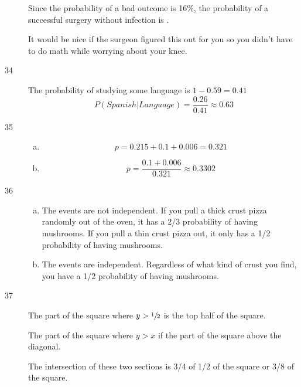 \documentclass[letterpaper]{exam}
\begin{document}
\begin{description}
        Since the probability of a bad outcome is 16\%, the probability of a
        successful surgery without infection is .

        It would be nice if the surgeon figured this out for you so you didn't
        have to do math while worrying about your knee.


      \item[34]
        The probability of studying some language is $1 - 0.59 = 0.41$
        \[
          P(Spanish | Language) = \frac{0.26}{0.41} \approx 0.63
        \]

      \item[35]
        \begin{enumerate}[(a)]
          \item 
            \[
              p = 0.215 + 0.1 + 0.006 = \boxed{ 0.321 }
            \]

          \item
            \[
              p = \frac{0.1 + 0.006}{0.321} \approx \boxed{ 0.3302 }
            \]
        \end{enumerate}

      \item[36]
        \begin{enumerate}[(a)]
          \item The events are not independent. If you pull a thick crust pizza
            randomly out of the oven, it has a 2/3 probability of having
            mushrooms. If you pull a thin crust pizza out, it only has a 1/2
            probability of having mushrooms.

          \item The events are independent. Regardless of what kind of crust you
            find, you have a 1/2 probability of having mushrooms.
        \end{enumerate}

      \item[37]
        The part of the square where $y > \sfrac{1}{2}$ is the top half of the
        square.

        The part of the square where $y > x$ if the part of the square above the
        diagonal.

        The intersection of these two sections is 3/4 of 1/2 of the square or
        3/8 of the square. 
        

\end{description}
\end{document}
